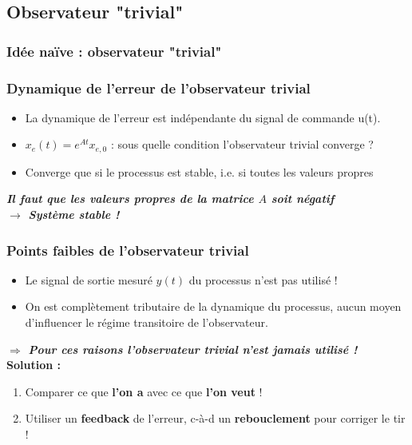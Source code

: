 \documentclass[document.tex]{subfiles}
\begin{document}

\subsection{Observateur "trivial"}
\subsubsection{Idée naïve : observateur "trivial"}


\subsubsection{Dynamique de l'erreur de l'observateur trivial}


\begin{itemize}
\item La dynamique de l'erreur est indépendante du signal de commande u(t).
\item $x_e(t) = e^{At}x_{e,0}$ : sous quelle condition l'observateur trivial converge ?
\item Converge que si le processus est stable, i.e. si toutes les valeurs propres
\end{itemize}

\begin{center}
\textit{\textbf{Il faut que les valeurs propres de la matrice $A$ soit négatif \\ $\longrightarrow$ Système stable !}}
\end{center}

\subsubsection{Points faibles de l'observateur trivial}

\begin{itemize}
\item Le signal de sortie mesuré $y(t)$ du processus n'est pas utilisé !
\item On est complètement tributaire de la dynamique du processus, aucun moyen d'influencer le régime transitoire de l'observateur.
\end{itemize}

\textit{\textbf{$\Rightarrow$ Pour ces raisons l'observateur trivial n'est jamais utilisé !}}\\

\textbf{Solution : }
\begin{enumerate}
\item Comparer ce que \textbf{l'on a} avec ce que \textbf{l'on veut} !
\item Utiliser un \textbf{feedback} de l'erreur, c-à-d un \textbf{rebouclement} pour corriger le tir !
\end{enumerate}
\end{document}
